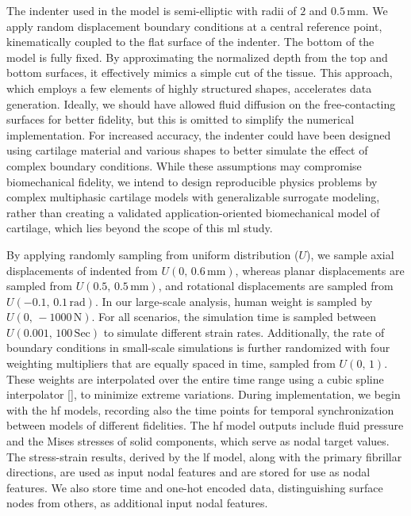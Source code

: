 The indenter used in the model is semi-elliptic with radii of $2$ and $0.5 \, \text{mm}$. We apply random displacement boundary conditions at a central reference point, kinematically coupled to the flat surface of the indenter. The bottom of the model is fully fixed. By approximating the normalized depth from the top and bottom surfaces, it effectively mimics a simple cut of the tissue. This approach, which employs a few elements of highly structured shapes, accelerates data generation. Ideally, we should have allowed fluid diffusion on the free-contacting surfaces for better fidelity, but this is omitted to simplify the numerical implementation. For increased accuracy, the indenter could have been designed using cartilage material and various shapes to better simulate the effect of complex boundary conditions. While these assumptions may compromise biomechanical fidelity, we intend to design reproducible physics problems by complex multiphasic cartilage models with generalizable surrogate modeling, rather than creating a validated application-oriented biomechanical model of cartilage, which lies beyond the scope of this \ac{ml} study.

By applying randomly sampling from uniform distribution ($U$), we sample axial displacements of indented from $U(0, \, 0.6\,\text{mm})$, whereas planar displacements are sampled from $U(0.5, \, 0.5\,\text{mm})$, and rotational displacements are sampled from $U(-0.1, \, 0.1\,\text{rad})$. In our large-scale analysis, human weight is sampled by $U(0, \, -1000\,\text{N})$. For all scenarios, the simulation time is sampled between $U(0.001, \, 100\,\text{Sec})$ to simulate different strain rates. Additionally, the rate of boundary conditions in small-scale simulations is further randomized with four weighting multipliers that are equally spaced in time, sampled from $U(0, \, 1)$. These weights are interpolated over the entire time range using a cubic spline interpolator [\cite{de_boor1978}], to minimize extreme variations. During implementation, we begin with the \ac{hf} models, recording also the time points for temporal synchronization between models of different fidelities. The \ac{hf} model outputs include fluid pressure and the Mises stresses of solid components, which serve as nodal target values. The stress-strain results, derived by the \ac{lf} model, along with the primary fibrillar directions, are used as input nodal features and are stored for use as nodal features. We also store time and one-hot encoded data, distinguishing surface nodes from others, as additional input nodal features.

